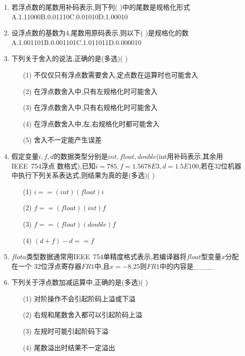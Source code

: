 \documentclass[12pt, a4paper, oneside, UTF8]{ctexbook}
\begin{document}
\begin{enumerate}
    \item 若浮点数的尾数用补码表示,则下列(   )中的尾数是规格化形式 \\
    A.1.11000\qquad B.0.01110\qquad C.0.01010\qquad D.1.00010 

    \item 设浮点数的基数为4,尾数用原码表示,则以下(   )是规格化的数 \\
    A.1.001101\qquad B.0.001101\qquad C.1.011011\qquad D.0.000010 

    \item 下列关于舍入的说法,正确的是(多选)(   )
    \begin{enumerate}
        \item [(1)] 不仅仅只有浮点数需要舍入,定点数在运算时也可能舍入 
        \item [(2)] 在浮点数舍入中,只有左规格化时可能舍入
        \item [(3)] 在浮点数舍入中,只有右规格化时可能舍入
        \item [(4)] 在浮点数舍入中,左,右规格化时都可能舍入
        \item [(5)] 舍入不一定能产生误差
    \end{enumerate}

    \item \bt 假定变量$i,f,d$的数据类型分别是$int,float,double$(int用补码表示,其余用IEEE\ 754浮点
    数格式),已知$i=785,f=1.5678E3,d=1.5E100$,若在$32$位机器中执行下列关系表达式,则结果为真的是(多选)(   )
    \begin{enumerate}
        \item [(1)] $i==(int)(float)i$ 
        \item [(2)] $f==(float)(int)f$ 
        \item [(3)] $f==(float)(double)f$
        \item [(4)] $(d+f)-d==f$
    \end{enumerate}

    \item \bt $flota$类型数据通常用IEEE\ 754单精度格式表示,若编译器将$float$型变量$x$分配在一个
    32位浮点寄存器$FR1$中,且$x=-8.25$则$FR1$中的内容是\_\_\_\_ 

    \item \bt 下列关于浮点数加减运算中,正确的是(多选)(    )
    \begin{enumerate}
        \item [(1)] 对阶操作不会引起阶码上溢或下溢 
        \item [(2)] 右规和尾数舍入都可以引起阶码上溢 
        \item [(3)] 左规时可能引起阶码下溢 
        \item [(4)] 尾数溢出时结果不一定溢出 
    \end{enumerate}


\end{enumerate}
\end{document}
